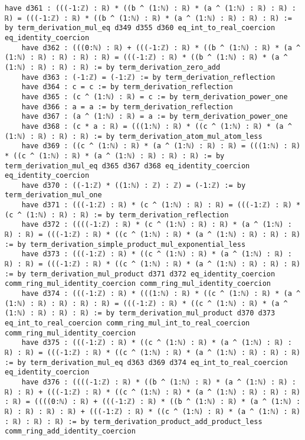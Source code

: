 \documentclass{article}
\begin{document}
\begin{tcolorbox}[colback=white!10, width=\linewidth]
\begin{lstlisting}[language=Lean4]
    have d361 : (((-1:ℤ) : ℝ) * ((b ^ (1:ℕ) : ℝ) * (a ^ (1:ℕ) : ℝ) : ℝ) : ℝ) = (((-1:ℤ) : ℝ) * ((b ^ (1:ℕ) : ℝ) * (a ^ (1:ℕ) : ℝ) : ℝ) : ℝ) := by term_derivation_mul_eq d349 d355 d360 eq_int_to_real_coercion eq_identity_coercion
    have d362 : (((0:ℕ) : ℝ) + (((-1:ℤ) : ℝ) * ((b ^ (1:ℕ) : ℝ) * (a ^ (1:ℕ) : ℝ) : ℝ) : ℝ) : ℝ) = (((-1:ℤ) : ℝ) * ((b ^ (1:ℕ) : ℝ) * (a ^ (1:ℕ) : ℝ) : ℝ) : ℝ) := by term_derivation_zero_add
    have d363 : (-1:ℤ) = (-1:ℤ) := by term_derivation_reflection
    have d364 : c = c := by term_derivation_reflection
    have d365 : (c ^ (1:ℕ) : ℝ) = c := by term_derivation_power_one
    have d366 : a = a := by term_derivation_reflection
    have d367 : (a ^ (1:ℕ) : ℝ) = a := by term_derivation_power_one
    have d368 : (c * a : ℝ) = (((1:ℕ) : ℝ) * ((c ^ (1:ℕ) : ℝ) * (a ^ (1:ℕ) : ℝ) : ℝ) : ℝ) := by term_derivation_atom_mul_atom_less
    have d369 : ((c ^ (1:ℕ) : ℝ) * (a ^ (1:ℕ) : ℝ) : ℝ) = (((1:ℕ) : ℝ) * ((c ^ (1:ℕ) : ℝ) * (a ^ (1:ℕ) : ℝ) : ℝ) : ℝ) := by term_derivation_mul_eq d365 d367 d368 eq_identity_coercion eq_identity_coercion
    have d370 : ((-1:ℤ) * ((1:ℕ) : ℤ) : ℤ) = (-1:ℤ) := by term_derivation_mul_one
    have d371 : (((-1:ℤ) : ℝ) * (c ^ (1:ℕ) : ℝ) : ℝ) = (((-1:ℤ) : ℝ) * (c ^ (1:ℕ) : ℝ) : ℝ) := by term_derivation_reflection
    have d372 : ((((-1:ℤ) : ℝ) * (c ^ (1:ℕ) : ℝ) : ℝ) * (a ^ (1:ℕ) : ℝ) : ℝ) = (((-1:ℤ) : ℝ) * ((c ^ (1:ℕ) : ℝ) * (a ^ (1:ℕ) : ℝ) : ℝ) : ℝ) := by term_derivation_simple_product_mul_exponential_less
    have d373 : (((-1:ℤ) : ℝ) * ((c ^ (1:ℕ) : ℝ) * (a ^ (1:ℕ) : ℝ) : ℝ) : ℝ) = (((-1:ℤ) : ℝ) * ((c ^ (1:ℕ) : ℝ) * (a ^ (1:ℕ) : ℝ) : ℝ) : ℝ) := by term_derivation_mul_product d371 d372 eq_identity_coercion comm_ring_mul_identity_coercion comm_ring_mul_identity_coercion
    have d374 : (((-1:ℤ) : ℝ) * (((1:ℕ) : ℝ) * ((c ^ (1:ℕ) : ℝ) * (a ^ (1:ℕ) : ℝ) : ℝ) : ℝ) : ℝ) = (((-1:ℤ) : ℝ) * ((c ^ (1:ℕ) : ℝ) * (a ^ (1:ℕ) : ℝ) : ℝ) : ℝ) := by term_derivation_mul_product d370 d373 eq_int_to_real_coercion comm_ring_mul_int_to_real_coercion comm_ring_mul_identity_coercion
    have d375 : (((-1:ℤ) : ℝ) * ((c ^ (1:ℕ) : ℝ) * (a ^ (1:ℕ) : ℝ) : ℝ) : ℝ) = (((-1:ℤ) : ℝ) * ((c ^ (1:ℕ) : ℝ) * (a ^ (1:ℕ) : ℝ) : ℝ) : ℝ) := by term_derivation_mul_eq d363 d369 d374 eq_int_to_real_coercion eq_identity_coercion
    have d376 : ((((-1:ℤ) : ℝ) * ((b ^ (1:ℕ) : ℝ) * (a ^ (1:ℕ) : ℝ) : ℝ) : ℝ) + (((-1:ℤ) : ℝ) * ((c ^ (1:ℕ) : ℝ) * (a ^ (1:ℕ) : ℝ) : ℝ) : ℝ) : ℝ) = ((((0:ℕ) : ℝ) + (((-1:ℤ) : ℝ) * ((b ^ (1:ℕ) : ℝ) * (a ^ (1:ℕ) : ℝ) : ℝ) : ℝ) : ℝ) + (((-1:ℤ) : ℝ) * ((c ^ (1:ℕ) : ℝ) * (a ^ (1:ℕ) : ℝ) : ℝ) : ℝ) : ℝ) := by term_derivation_product_add_product_less comm_ring_add_identity_coercion

\end{lstlisting}
\end{tcolorbox}
\end{document}
